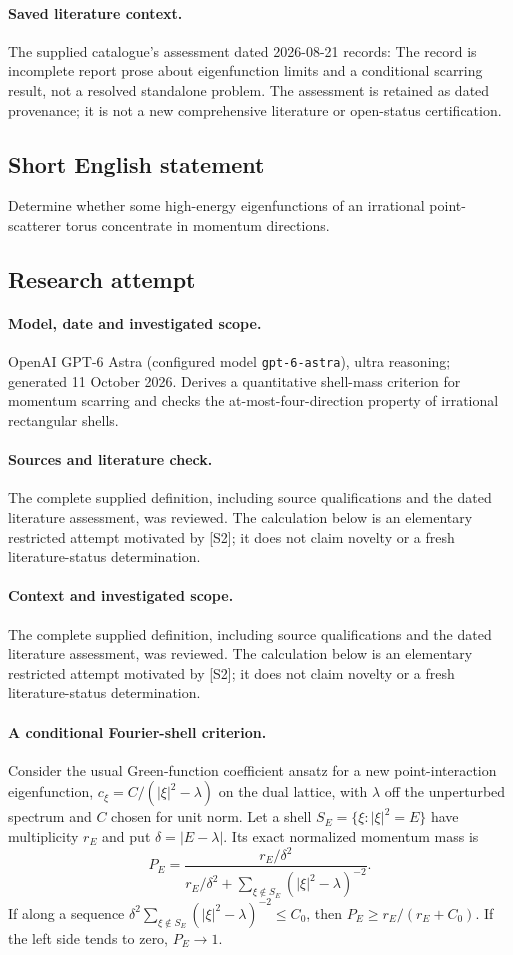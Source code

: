 \documentclass[11pt]{article}
\begin{document}
\paragraph{Saved literature context.} The supplied catalogue's assessment dated 2026-08-21 records: The record is incomplete report prose about eigenfunction limits and a conditional scarring result, not a resolved standalone problem. The assessment is retained as dated provenance; it is not a new comprehensive literature or open-status certification.
\subsection{Short English statement}
Determine whether some high-energy eigenfunctions of an irrational point-scatterer torus concentrate in momentum directions.
\subsection{Research attempt}
\paragraph{Model, date and investigated scope.}
OpenAI GPT-6 Astra (configured model \texttt{gpt-6-astra}), ultra reasoning; generated 11 October 2026. Derives a quantitative shell-mass criterion for momentum scarring and checks the at-most-four-direction property of irrational rectangular shells.

\paragraph{Sources and literature check.}
The complete supplied definition, including source qualifications and the dated literature assessment, was reviewed. The calculation below is an elementary restricted attempt motivated by [S2]; it does not claim novelty or a fresh literature-status determination.

\paragraph{Context and investigated scope.} The complete supplied definition, including source qualifications and the dated literature assessment, was reviewed. The calculation below is an elementary restricted attempt motivated by [S2]; it does not claim novelty or a fresh literature-status determination.

\paragraph{A conditional Fourier-shell criterion.} Consider the usual Green-function coefficient ansatz for a new point-interaction eigenfunction, $c_\xi=C/(|\xi|^2-\lambda)$ on the dual lattice, with $\lambda$ off the unperturbed spectrum and $C$ chosen for unit norm. Let a shell $S_E=\{\xi:|\xi|^2=E\}$ have multiplicity $r_E$ and put $\delta=|E-\lambda|$. Its exact normalized momentum mass is
\[
 P_E=\frac{r_E/\delta^2}{r_E/\delta^2+\sum_{\xi\notin S_E}(|\xi|^2-\lambda)^{-2}}.
\]
If along a sequence $\delta^2\sum_{\xi\notin S_E}(|\xi|^2-\lambda)^{-2}\leq C_0$, then $P_E\geq r_E/(r_E+C_0)$. If the left side tends to zero, $P_E\to1$.
\end{document}
